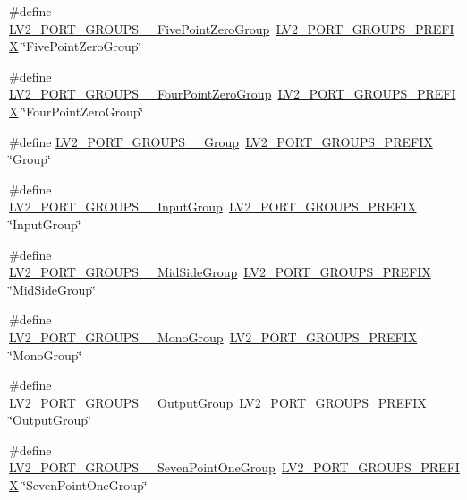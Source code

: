 \begin{DoxyCompactItemize}
\item 
\#define \hyperlink{port-groups_8h_ad8ce3cba322077b095e81f6497043be8}{L\+V2\+\_\+\+P\+O\+R\+T\+\_\+\+G\+R\+O\+U\+P\+S\+\_\+\+\_\+\+Five\+Point\+Zero\+Group}~\hyperlink{port-groups_8h_ad8eff71f3c96d9bf45282fed8195fde3}{L\+V2\+\_\+\+P\+O\+R\+T\+\_\+\+G\+R\+O\+U\+P\+S\+\_\+\+P\+R\+E\+F\+IX} \char`\"{}Five\+Point\+Zero\+Group\char`\"{}
\item 
\#define \hyperlink{port-groups_8h_aa8229b8c939f001960264c4fd660dada}{L\+V2\+\_\+\+P\+O\+R\+T\+\_\+\+G\+R\+O\+U\+P\+S\+\_\+\+\_\+\+Four\+Point\+Zero\+Group}~\hyperlink{port-groups_8h_ad8eff71f3c96d9bf45282fed8195fde3}{L\+V2\+\_\+\+P\+O\+R\+T\+\_\+\+G\+R\+O\+U\+P\+S\+\_\+\+P\+R\+E\+F\+IX} \char`\"{}Four\+Point\+Zero\+Group\char`\"{}
\item 
\#define \hyperlink{port-groups_8h_a9ca65b765f6698447d8ba987f70675b1}{L\+V2\+\_\+\+P\+O\+R\+T\+\_\+\+G\+R\+O\+U\+P\+S\+\_\+\+\_\+\+Group}~\hyperlink{port-groups_8h_ad8eff71f3c96d9bf45282fed8195fde3}{L\+V2\+\_\+\+P\+O\+R\+T\+\_\+\+G\+R\+O\+U\+P\+S\+\_\+\+P\+R\+E\+F\+IX} \char`\"{}Group\char`\"{}
\item 
\#define \hyperlink{port-groups_8h_ace12b604137c666f230cf54122517e3d}{L\+V2\+\_\+\+P\+O\+R\+T\+\_\+\+G\+R\+O\+U\+P\+S\+\_\+\+\_\+\+Input\+Group}~\hyperlink{port-groups_8h_ad8eff71f3c96d9bf45282fed8195fde3}{L\+V2\+\_\+\+P\+O\+R\+T\+\_\+\+G\+R\+O\+U\+P\+S\+\_\+\+P\+R\+E\+F\+IX} \char`\"{}Input\+Group\char`\"{}
\item 
\#define \hyperlink{port-groups_8h_a32df778b2385b14a7f22f8cfc53bb1aa}{L\+V2\+\_\+\+P\+O\+R\+T\+\_\+\+G\+R\+O\+U\+P\+S\+\_\+\+\_\+\+Mid\+Side\+Group}~\hyperlink{port-groups_8h_ad8eff71f3c96d9bf45282fed8195fde3}{L\+V2\+\_\+\+P\+O\+R\+T\+\_\+\+G\+R\+O\+U\+P\+S\+\_\+\+P\+R\+E\+F\+IX} \char`\"{}Mid\+Side\+Group\char`\"{}
\item 
\#define \hyperlink{port-groups_8h_a0f41c73c6bc5e1745aefd5bf84112428}{L\+V2\+\_\+\+P\+O\+R\+T\+\_\+\+G\+R\+O\+U\+P\+S\+\_\+\+\_\+\+Mono\+Group}~\hyperlink{port-groups_8h_ad8eff71f3c96d9bf45282fed8195fde3}{L\+V2\+\_\+\+P\+O\+R\+T\+\_\+\+G\+R\+O\+U\+P\+S\+\_\+\+P\+R\+E\+F\+IX} \char`\"{}Mono\+Group\char`\"{}
\item 
\#define \hyperlink{port-groups_8h_a367fa1ea08e237df092aefb5beb40c64}{L\+V2\+\_\+\+P\+O\+R\+T\+\_\+\+G\+R\+O\+U\+P\+S\+\_\+\+\_\+\+Output\+Group}~\hyperlink{port-groups_8h_ad8eff71f3c96d9bf45282fed8195fde3}{L\+V2\+\_\+\+P\+O\+R\+T\+\_\+\+G\+R\+O\+U\+P\+S\+\_\+\+P\+R\+E\+F\+IX} \char`\"{}Output\+Group\char`\"{}
\item 
\#define \hyperlink{port-groups_8h_ae59b0f18ca286de7ec4e3170b0d6a824}{L\+V2\+\_\+\+P\+O\+R\+T\+\_\+\+G\+R\+O\+U\+P\+S\+\_\+\+\_\+\+Seven\+Point\+One\+Group}~\hyperlink{port-groups_8h_ad8eff71f3c96d9bf45282fed8195fde3}{L\+V2\+\_\+\+P\+O\+R\+T\+\_\+\+G\+R\+O\+U\+P\+S\+\_\+\+P\+R\+E\+F\+IX} \char`\"{}Seven\+Point\+One\+Group\char`\"{}

\end{DoxyCompactItemize}

